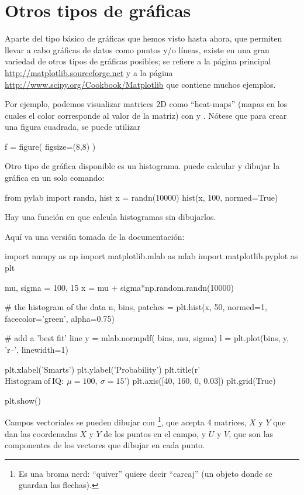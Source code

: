 \section{Otros tipos de gráficas}
Aparte del tipo básico de gráficas que hemos visto hasta ahora, que permiten llevar a cabo gráficas de datos como puntos y/o líneas, existe en  una gran variedad de otros tipos de gráficas posibles; se refiere a la página principal \url{http://matplotlib.sourceforge.net} y a la página 
\url{http://www.scipy.org/Cookbook/Matplotlib} que contiene muchos ejemplos.

Por ejemplo, podemos visualizar matrices 2D como ``heat-maps'' (mapas en los cuales el color corresponde al valor de la matriz) con  y . Nótese que para crear una figura cuadrada, se puede utilizar
\begin{python}
f = figure( figsize=(8,8) )
\end{python}

Otro tipo de gráfica disponible es un histograma.  puede calcular y dibujar la gráfica en un solo comando:
\begin{python}
from pylab import randn, hist
x = randn(10000)
hist(x, 100, normed=True)
\end{python}
Hay una función  en  que calcula histogramas sin dibujarlos.

Aquí va una versión tomada de la documentación:
\begin{python}
import numpy as np
import matplotlib.mlab as mlab
import matplotlib.pyplot as plt

mu, sigma = 100, 15
x = mu + sigma*np.random.randn(10000)

# the histogram of the data
n, bins, patches = plt.hist(x, 50, normed=1, facecolor='green', alpha=0.75)

# add a 'best fit' line
y = mlab.normpdf( bins, mu, sigma)
l = plt.plot(bins, y, 'r--', linewidth=1)

plt.xlabel('Smarts')
plt.ylabel('Probability')
plt.title(r'$\mathrm{Histogram\ of\ IQ:}\ \mu=100,\ \sigma=15$')
plt.axis([40, 160, 0, 0.03])
plt.grid(True)

plt.show()
\end{python}


Campos vectoriales se pueden dibujar con \footnote{Es una broma nerd: ``quiver'' quiere decir ``carcaj'' (un objeto donde se guardan las flechas).}, que acepta 4 matrices, $X$ y $Y$ que dan las coordenadas $X$ y $Y$ de los puntos en el campo, y $U$ y $V$, que son las componentes de los vectores que dibujar en cada punto.



